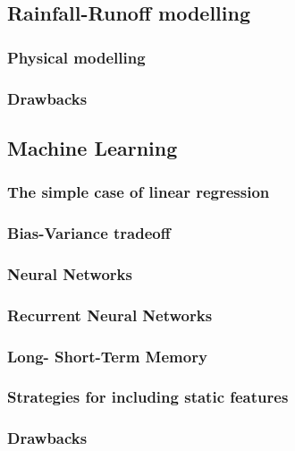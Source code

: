 \subsection{Rainfall-Runoff modelling}
\subsubsection{Physical modelling}
\subsubsection{Drawbacks}

\subsection{Machine Learning}
\subsubsection{The simple case of linear regression}
\subsubsection{Bias-Variance tradeoff}
\subsubsection{Neural Networks}
\subsubsection{Recurrent Neural Networks}
\subsubsection{Long- Short-Term Memory}
\subsubsection{Strategies for including static features}
\subsubsection{Drawbacks}
